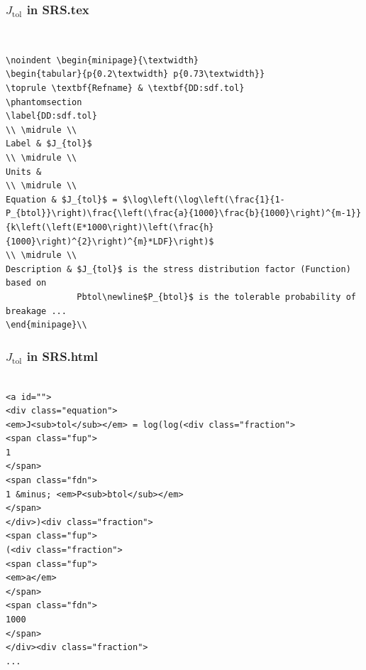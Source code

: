 \documentclass{beamer}
\begin{document}

\begin{frame}

\frametitle{$J_{\mbox{tol}}$ in SRS.tex}
~\\
\begin{lstlisting}
\noindent \begin{minipage}{\textwidth}
\begin{tabular}{p{0.2\textwidth} p{0.73\textwidth}}
\toprule \textbf{Refname} & \textbf{DD:sdf.tol}
\phantomsection 
\label{DD:sdf.tol}
\\ \midrule \\
Label & $J_{tol}$
\\ \midrule \\
Units & 
\\ \midrule \\
Equation & $J_{tol}$ = $\log\left(\log\left(\frac{1}{1-P_{btol}}\right)\frac{\left(\frac{a}{1000}\frac{b}{1000}\right)^{m-1}}{k\left(\left(E*1000\right)\left(\frac{h}{1000}\right)^{2}\right)^{m}*LDF}\right)$
\\ \midrule \\
Description & $J_{tol}$ is the stress distribution factor (Function) based on
              Pbtol\newline$P_{btol}$ is the tolerable probability of breakage ...
\end{minipage}\\
\end{lstlisting}
\end{frame}


\begin{frame}

\frametitle{$J_{\mbox{tol}}$ in SRS.html}

\begin{lstlisting}

<a id="">
<div class="equation">
<em>J<sub>tol</sub></em> = log(log(<div class="fraction">
<span class="fup">
1
</span>
<span class="fdn">
1 &minus; <em>P<sub>btol</sub></em>
</span>
</div>)<div class="fraction">
<span class="fup">
(<div class="fraction">
<span class="fup">
<em>a</em>
</span>
<span class="fdn">
1000
</span>
</div><div class="fraction">
...
\end{lstlisting}

\end{frame}
\end{document}
